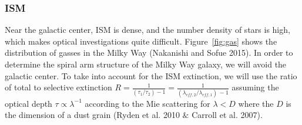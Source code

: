 \documentclass[letterpaper,11pt]{article}
\begin{document}

\subsubsection{ISM}

Near the galactic center, ISM is dense, and the number density of stars is high, which makes optical investigations quite difficult. Figure~\ref{fig:gas} shows the distribution of gasses in the Milky Way (Nakanishi and Sofue 2015). In order to determine the spiral arm structure of the Milky Way galaxy, we will avoid the galactic center. To take into account for the ISM extinction, we will use the ratio of total to selective extinction $R = \frac{1}{(\tau_{1} / \tau_{2}) -1} = \frac{1}{(\lambda_{eff,2} / \lambda_{eff,1}) \, -1}$ assuming the optical depth $\tau \propto \lambda^{-1}$ according to the Mie scattering for $\lambda < D$ where the $D$ is the dimension of a dust grain (Ryden et al. 2010 $\&$ Carroll et al. 2007). 
\end{document}
